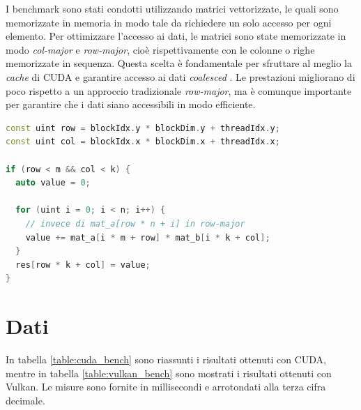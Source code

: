 \newpage


I benchmark sono stati condotti utilizzando matrici vettorizzate, le quali sono memorizzate in memoria in modo tale da richiedere un solo accesso per ogni elemento. Per ottimizzare l'accesso ai dati, le matrici sono state memorizzate in modo \textit{col-major} e \textit{row-major}, cioè rispettivamente con le colonne o righe memorizzate in sequenza. Questa scelta è fondamentale per sfruttare al meglio la \textit{cache} di \gls{CUDA} e garantire accesso ai dati \textit{coalesced} \cite[]{CUDA:Massive}. Le prestazioni migliorano di poco rispetto a un approccio tradizionale \textit{row-major}, ma è comunque importante per garantire che i dati siano accessibili in modo efficiente.

\vspace{5mm}
\begin{lstlisting}[language=C++, caption=Accesso ai dati in col-major e row-major, label=lis:col-major]
const uint row = blockIdx.y * blockDim.y + threadIdx.y;
const uint col = blockIdx.x * blockDim.x + threadIdx.x;

if (row < m && col < k) {
  auto value = 0;

  for (uint i = 0; i < n; i++) {
    // invece di mat_a[row * n + i] in row-major
    value += mat_a[i * m + row] * mat_b[i * k + col];
  }
  res[row * k + col] = value;
}
\end{lstlisting}
\vspace{5mm}

\newpage
\section{Dati}

In tabella \ref{table:cuda_bench} sono riassunti i risultati ottenuti con \gls{CUDA}, mentre in tabella \ref{table:vulkan_bench} sono mostrati i risultati ottenuti con Vulkan. Le misure sono fornite in millisecondi e arrotondati alla terza cifra decimale.


